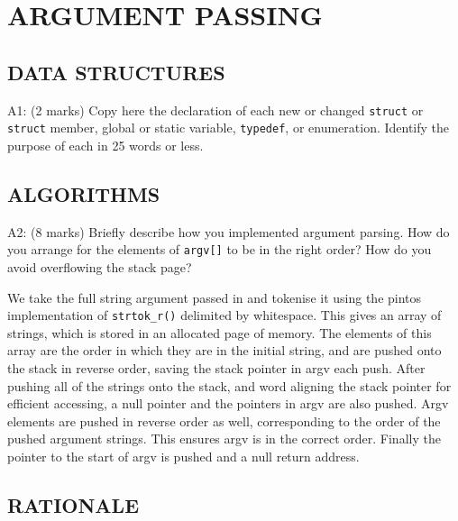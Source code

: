 \section{ARGUMENT PASSING}

\subsection*{DATA STRUCTURES}

\noindent A1: (2 marks)
Copy here the declaration of each new or changed \texttt{struct} or \texttt{struct} member, global or static variable, \texttt{typedef}, or enumeration.  Identify the purpose of each in 25 words or less.




\subsection*{ALGORITHMS}

\noindent A2: (8 marks)
Briefly describe how you implemented argument parsing.  How do
you arrange for the elements of \texttt{argv[]} to be in the right order?
How do you avoid overflowing the stack page?


We take the full string argument passed in and tokenise it using the pintos implementation of \texttt{strtok\_r()} delimited by whitespace. This gives an array of strings, which is stored in an allocated page of memory. The elements of this array are the order in which they are in the initial string, and are pushed onto the stack in reverse order, saving the stack pointer in argv each push. After pushing all of the strings onto the stack, and word aligning the stack pointer for efficient accessing, a null pointer and the pointers in argv are also pushed. Argv elements are pushed in reverse order as well, corresponding to the order of the pushed argument strings. This ensures argv is in the correct order. Finally the pointer to the start of argv is pushed and a null return address.



\subsection*{RATIONALE}

